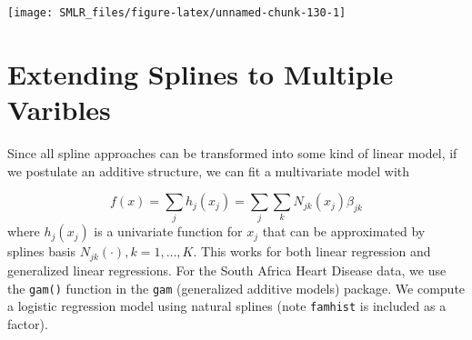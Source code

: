 \documentclass[
]{book}
\theoremstyle{definition}
\theoremstyle{definition}
\theoremstyle{definition}
\theoremstyle{definition}
\theoremstyle{remark}
\begin{document}
\begin{center}\texttt{[image: SMLR\_files/figure-latex/unnamed-chunk-130-1]} \end{center}

\hypertarget{extending-splines-to-multiple-varibles}{%
\section{Extending Splines to Multiple Varibles}\label{extending-splines-to-multiple-varibles}}

Since all spline approaches can be transformed into some kind of linear model, if we postulate an additive structure, we can fit a multivariate model with

\[f(x) = \sum_j h_j(x_j) = \sum_j \sum_k N_{jk}(x_j) \beta_{jk}\]
where \(h_j(x_j)\) is a univariate function for \(x_j\) that can be approximated by splines basis \(N_{jk}(\cdot), k = 1, \ldots, K\). This works for both linear regression and generalized linear regressions. For the South Africa Heart Disease data, we use the \texttt{gam()} function in the \texttt{gam} (generalized additive models) package. We compute a logistic regression model using natural splines (note \texttt{famhist} is included as a factor).
\end{document}
